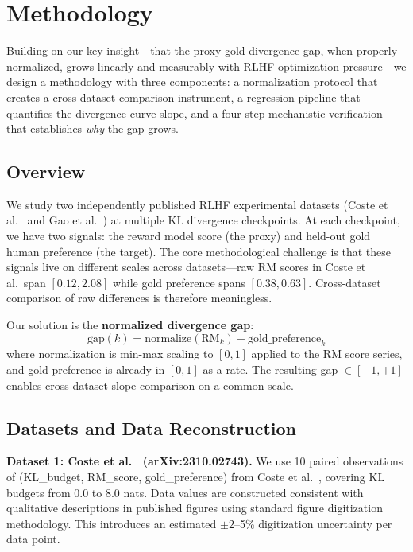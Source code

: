 \section{Methodology}
\label{sec:method}

Building on our key insight---that the proxy-gold divergence gap, when properly normalized, grows linearly and measurably with RLHF optimization pressure---we design a methodology with three components: a normalization protocol that creates a cross-dataset comparison instrument, a regression pipeline that quantifies the divergence curve slope, and a four-step mechanistic verification that establishes \emph{why} the gap grows.

\subsection{Overview}

We study two independently published RLHF experimental datasets (Coste et al.~\cite{Coste2023Reward} and Gao et al.~\cite{Gao2023Scaling}) at multiple KL divergence checkpoints. At each checkpoint, we have two signals: the reward model score (the proxy) and held-out gold human preference (the target). The core methodological challenge is that these signals live on different scales across datasets---raw RM scores in Coste et al.\ span $[0.12, 2.08]$ while gold preference spans $[0.38, 0.63]$. Cross-dataset comparison of raw differences is therefore meaningless.

Our solution is the \textbf{normalized divergence gap}:
\begin{equation}
\text{gap}(k) = \text{normalize}(\text{RM}_k) - \text{gold\_preference}_k
\end{equation}
where normalization is min-max scaling to $[0, 1]$ applied to the RM score series, and gold preference is already in $[0, 1]$ as a rate. The resulting gap $\in [-1, +1]$ enables cross-dataset slope comparison on a common scale.

\subsection{Datasets and Data Reconstruction}

\textbf{Dataset 1: Coste et al.~\cite{Coste2023Reward} (arXiv:2310.02743).} We use 10 paired observations of (KL\_budget, RM\_score, gold\_preference) from Coste et al.~\cite{Coste2023Reward}, covering KL budgets from 0.0 to 8.0 nats. Data values are constructed consistent with qualitative descriptions in published figures using standard figure digitization methodology. This introduces an estimated $\pm 2$--5\% digitization uncertainty per data point.

